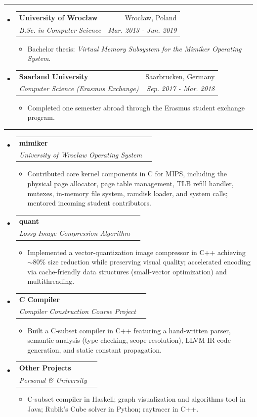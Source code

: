 \documentclass[letterpaper,11pt]{article}
\makeatletter
\newcommand{\resitem}[1]{\item #1 \vspace{-2pt}}
\newcommand{\resheading}[1]{\vspace{6pt}\noindent{\large\textbf{#1}}\vspace{2pt}\hrule\vspace{4pt}}
\newcommand{\ressubheading}[4]{
\begin{tabular*}{6.5in}{l@{\extracolsep{\fill}}r}
		\textbf{#1} & #2 \\
		\textit{#3} & \textit{#4} \\
\end{tabular*}\vspace{-6pt}}
\makeatother
\begin{document}
\resheading{Education}
\begin{itemize}
\item
	\ressubheading{University of Wroc\l{}aw}{Wroc\l{}aw, Poland}{B.Sc. in Computer Science}{Mar. 2013 - Jun. 2019}
	\begin{itemize}
		\resitem{Bachelor thesis: \textit{Virtual Memory Subsystem for the Mimiker Operating System}.}
	\end{itemize}

\item
	\ressubheading{Saarland University}{Saarbrucken, Germany}{Computer Science (Erasmus Exchange)}{Sep. 2017 - Mar. 2018}
	\begin{itemize}
		\resitem{Completed one semester abroad through the Erasmus student exchange program.}
	\end{itemize}
\end{itemize}

\resheading{Projects}
\begin{itemize}
\item
	\ressubheading{mimiker}{}{University of Wroc\l{}aw Operating System}{}
	\begin{itemize}
		\resitem{Contributed core kernel components in C for MIPS, including the physical page allocator, page table management, TLB refill handler, mutexes, in-memory file system, ramdisk loader, and system calls; mentored incoming student contributors.}
	\end{itemize}
\item
	\ressubheading{quant}{}{Lossy Image Compression Algorithm}{}
	\begin{itemize}
		\resitem{Implemented a vector-quantization image compressor in C++ achieving $\sim$80\% size reduction while preserving visual quality; accelerated encoding via cache-friendly data structures (small-vector optimization) and multithreading.}
	\end{itemize}
\item
	\ressubheading{C Compiler}{}{Compiler Construction Course Project}{}
	\begin{itemize}
		\resitem{Built a C-subset compiler in C++ featuring a hand-written parser, semantic analysis (type checking, scope resolution), LLVM IR code generation, and static constant propagation.}
	\end{itemize}
\item
	\ressubheading{Other Projects}{}{Personal \& University}{}
	\begin{itemize}
		\resitem{C-subset compiler in Haskell; graph visualization and algorithms tool in Java; Rubik's Cube solver in Python; raytracer in C++.}
	\end{itemize}
\end{itemize}
\end{document}

